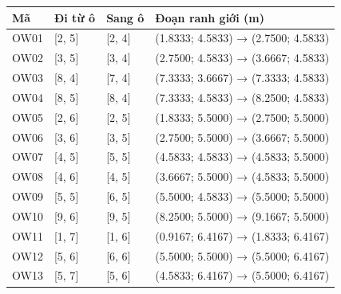 \documentclass[
  11pt,
  a4paper,
]{article}
\newcounter{none} %
\begin{document}
{\def\LTcaptype{none} %
\begin{longtable}[]{@{}
  >{\raggedright\arraybackslash}p{}
  >{\raggedright\arraybackslash}p{}
  >{\raggedright\arraybackslash}p{}
  >{\raggedright\arraybackslash}p{}@{}}
\toprule\noalign{}
\begin{minipage}[b]{\linewidth}\raggedright
Mã
\end{minipage} & \begin{minipage}[b]{\linewidth}\raggedright
Đi từ ô
\end{minipage} & \begin{minipage}[b]{\linewidth}\raggedright
Sang ô
\end{minipage} & \begin{minipage}[b]{\linewidth}\raggedright
Đoạn ranh giới (m)
\end{minipage} \\
\midrule\noalign{}
\endhead
\bottomrule\noalign{}
\endlastfoot
OW01 & {[}2, 5{]} & {[}2, 4{]} & (1.8333; 4.5833) → (2.7500; 4.5833) \\
OW02 & {[}3, 5{]} & {[}3, 4{]} & (2.7500; 4.5833) → (3.6667; 4.5833) \\
OW03 & {[}8, 4{]} & {[}7, 4{]} & (7.3333; 3.6667) → (7.3333; 4.5833) \\
OW04 & {[}8, 5{]} & {[}8, 4{]} & (7.3333; 4.5833) → (8.2500; 4.5833) \\
OW05 & {[}2, 6{]} & {[}2, 5{]} & (1.8333; 5.5000) → (2.7500; 5.5000) \\
OW06 & {[}3, 6{]} & {[}3, 5{]} & (2.7500; 5.5000) → (3.6667; 5.5000) \\
OW07 & {[}4, 5{]} & {[}5, 5{]} & (4.5833; 4.5833) → (4.5833; 5.5000) \\
OW08 & {[}4, 6{]} & {[}4, 5{]} & (3.6667; 5.5000) → (4.5833; 5.5000) \\
OW09 & {[}5, 5{]} & {[}6, 5{]} & (5.5000; 4.5833) → (5.5000; 5.5000) \\
OW10 & {[}9, 6{]} & {[}9, 5{]} & (8.2500; 5.5000) → (9.1667; 5.5000) \\
OW11 & {[}1, 7{]} & {[}1, 6{]} & (0.9167; 6.4167) → (1.8333; 6.4167) \\
OW12 & {[}5, 6{]} & {[}6, 6{]} & (5.5000; 5.5000) → (5.5000; 6.4167) \\
OW13 & {[}5, 7{]} & {[}5, 6{]} & (4.5833; 6.4167) → (5.5000; 6.4167) \\

\end{longtable}}
\end{document}
